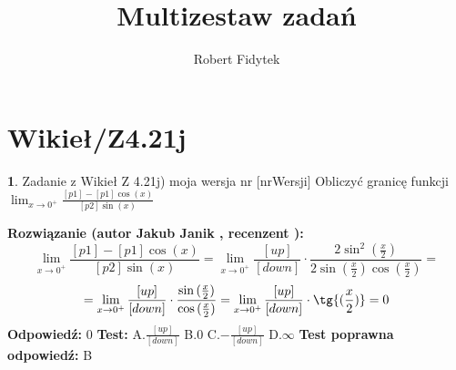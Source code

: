 \documentclass[12pt, a4paper]{article}
\title{Multizestaw zadań}
\author{Robert Fidytek}
\date{}
\theoremstyle{definition} %
\newtheorem{zad}{}
\newcommand{\kategoria}[1]{\section{#1}} %
\newcommand{\zadStart}[1]{\begin{zad}#1\newline} %
\newcommand{\zadStop}{\end{zad}}   %
\newcommand{\rozwStart}[2]{\noindent \textbf{Rozwiązanie (autor #1 , recenzent #2): }\newline} %
\newcommand{\odpStart}{\noindent \textbf{Odpowiedź:}\newline}    %
\newcommand{\odpStop}{\newline}                                             %
\newcommand{\testStart}{\noindent \textbf{Test:}\newline} %
\newcommand{\testStop}{\newline} %
\newcommand{\kluczStart}{\noindent \textbf{Test poprawna odpowiedź:}\newline} %
\newcommand{\kluczStop}{\newline} %
\begin{document}
\maketitle


\kategoria{Wikieł/Z4.21j}
\zadStart{Zadanie z Wikieł Z 4.21j) moja wersja nr [nrWersji]}
Obliczyć granicę funkcji $\lim_{x \to 0^+} \frac{[p1]-[p1]\cos{(x)}}{[p2]\sin{(x)}}$
\zadStop
\rozwStart{Jakub Janik}{}
$$\lim_{x \to 0^+} \frac{[p1]-[p1]\cos{(x)}}{[p2]\sin{(x)}}=\lim_{x \to 0^+}\frac{[up]}{[down]}\cdot \frac{2\sin^2{(\frac{x}{2})}}{2\sin{(\frac{x}{2})}\cos{(\frac{x}{2})}}=$$
$$=\lim_{x \to 0^+}\frac{[up]}{[down]}\cdot \frac{\sin{(\frac{x}{2})}}{\cos{(\frac{x}{2})}}=\lim_{x \to 0^+}\frac{[up]}{[down]}\cdot \tg{(\frac{x}{2})}=0$$
\odpStart
$0$
\odpStop
\testStart
A.$\frac{[up]}{[down]}$
B.$0$
C.$-\frac{[up]}{[down]}$
D.$\infty$
\testStop
\kluczStart
B
\kluczStop
\end{document}

